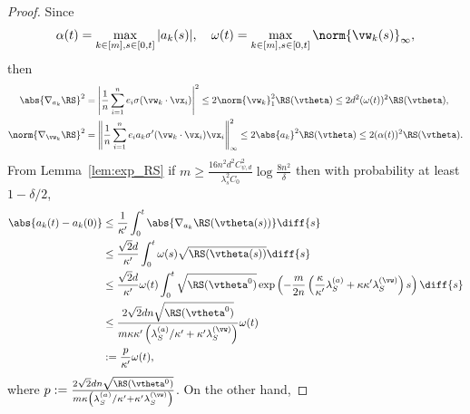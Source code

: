 \documentclass{article}
\begin{document}
\begin{proof}
    Since
    \begin{equation}
        \alpha(t)=\max\limits_{k\in[m],s\in[0,t]}|a_k(s)|, \quad \omega(t)=\max\limits_{k\in[m],s\in[0,t]}\norm{\vw_k(s)}_{\infty},
    \end{equation}
    then
    \begin{equation}
        \begin{aligned}
            \abs{\nabla_{a_k}\RS}^2    & =\left\lvert\frac{1}{n}\sum_{i=1}^n e_i\sigma(\vw_k\cdot\vx_i)\right\rvert^2\leq 2\norm{\vw_k}^2_1\RS(\vtheta)\leq 2d^2(\omega(t))^2\RS(\vtheta),            \\
            \norm{\nabla_{\vw_k}\RS}^2 & =\left\lVert\frac{1}{n}\sum_{i=1}^n e_i a_k\sigma'(\vw_k\cdot\vx_i)\vx_i\right\rVert^2_{\infty}\leq 2\abs{a_k}^2\RS(\vtheta)\leq 2(\alpha(t))^2\RS(\vtheta).
        \end{aligned}
    \end{equation}
    From Lemma~\ref{lem:exp_RS} if $m\geq \frac{16n^2d^2C_{\psi,d}^2}{\lambda_s^2C_0}\log\frac{8n^2}{\delta}$ then with probability at least $1 - \delta/2$,
    \begin{equation}
        \begin{aligned}
            \abs{a_k(t) - a_k(0)}
             & \leq\frac{1}{\kappa'}\int_0^t\abs{\nabla_{a_k}\RS(\vtheta(s))}\diff{s}                                                                                                                          \\
             & \leq\frac{\sqrt{2}d}{\kappa'}\int_{0}^{t} \omega(s)\sqrt{\RS(\vtheta(s))}\diff{s}                                                                                                               \\
             & \leq\frac{\sqrt{2}d}{\kappa'}\omega(t)\int_{0}^{t}\sqrt{\RS(\vtheta^0)}\exp\left(-\frac{m}{2n}\left(\frac{\kappa}{\kappa'}\lambda_S^{(a)}+\kappa\kappa'\lambda_S^{(\vw)}\right)s\right)\diff{s} \\
             & \leq \frac{2\sqrt{2}dn\sqrt{\RS(\vtheta^0)}}{m\kappa\kappa'\left(\lambda^{(a)}_S/\kappa'+\kappa'\lambda_S^{(\vw)}\right)}\omega(t)                                                              \\
             & :=\frac{p}{\kappa'}\omega(t),
        \end{aligned}
    \end{equation}
    where $p := \frac{2\sqrt{2}dn\sqrt{\RS(\vtheta^0)}}{m\kappa\left(\lambda_S^{(a)}/\kappa'+\kappa'\lambda_S^{(\vw)}\right)}$. On the other hand,

\end{proof}
\end{document}
